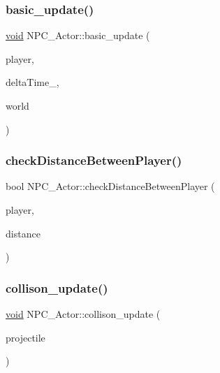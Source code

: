 \subsubsection{\texorpdfstring{basic\+\_\+update()}{basic\_update()}}
{\footnotesize\ttfamily \hyperlink{imgui__impl__opengl3__loader_8h_ac668e7cffd9e2e9cfee428b9b2f34fa7}{void} N\+P\+C\+\_\+\+Actor\+::basic\+\_\+update (\begin{DoxyParamCaption}\item[{std\+::shared\+\_\+ptr$<$ \hyperlink{classPlayer__Actor}{Player\+\_\+\+Actor} $>$}]{player,  }\item[{const float}]{delta\+Time\+\_\+,  }\item[{b2\+World $\ast$}]{world }\end{DoxyParamCaption})}

\mbox{\label{classNPC__Actor_a16c0a2ec5add05145d0065493cb5edd6}} 
\subsubsection{\texorpdfstring{check\+Distance\+Between\+Player()}{checkDistanceBetweenPlayer()}}
{\footnotesize\ttfamily bool N\+P\+C\+\_\+\+Actor\+::check\+Distance\+Between\+Player (\begin{DoxyParamCaption}\item[{\hyperlink{classPlayer__Actor}{Player\+\_\+\+Actor} $\ast$}]{player,  }\item[{float}]{distance }\end{DoxyParamCaption})}

\mbox{\label{classNPC__Actor_adce8bd20771bac78d7de190b81da119d}} 
\subsubsection{\texorpdfstring{collison\+\_\+update()}{collison\_update()}}
{\footnotesize\ttfamily \hyperlink{imgui__impl__opengl3__loader_8h_ac668e7cffd9e2e9cfee428b9b2f34fa7}{void} N\+P\+C\+\_\+\+Actor\+::collison\+\_\+update (\begin{DoxyParamCaption}\item[{std\+::shared\+\_\+ptr$<$ \hyperlink{classProjectile__Actor}{Projectile\+\_\+\+Actor} $>$}]{projectile }\end{DoxyParamCaption})}

